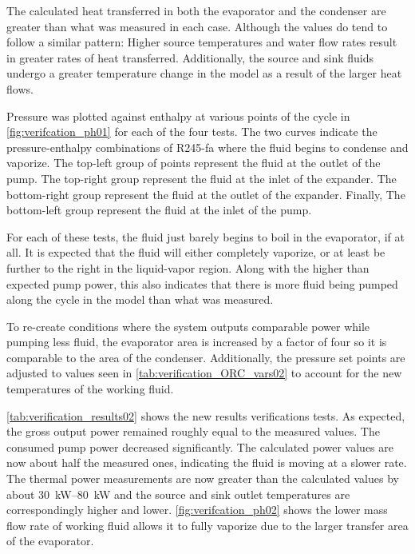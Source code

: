 The calculated heat transferred in both the evaporator and the condenser are greater than what was measured in each case. Although the values do tend to follow a similar pattern: Higher source temperatures and water flow rates result in greater rates of heat transferred. Additionally, the source and sink fluids undergo a greater temperature change in the model as a result of the larger heat flows.




Pressure was plotted against enthalpy at various points of the cycle in \autoref{fig:verifcation_ph01} for each of the four tests. The two curves indicate the pressure-enthalpy combinations of R245-fa where the fluid begins to condense and vaporize. The top-left group of points represent the fluid at the outlet of the pump. The top-right group represent the fluid at the inlet of the expander. The bottom-right group represent the fluid at the outlet of the expander. Finally, The bottom-left group represent the fluid at the inlet of the pump.

For each of these tests, the fluid just barely begins to boil in the evaporator, if at all. It is expected that the fluid will either completely vaporize, or at least be further to the right in the liquid-vapor region. Along with the higher than expected pump power, this also indicates that there is more fluid being pumped along the cycle in the model than what was measured.

To re-create conditions where the system outputs comparable power while pumping less fluid, the evaporator area is increased by a factor of four so it is comparable to the area of the condenser. Additionally, the pressure set points are adjusted to values seen in \autoref{tab:verification_ORC_vars02} to account for the new temperatures of the working fluid.


\autoref{tab:verification_results02} shows the new results verifications tests. As expected, the gross output power remained roughly equal to the measured values. The consumed pump power decreased significantly. The calculated power values are now about half the measured ones, indicating the fluid is moving at a slower rate. The thermal power measurements are now greater than the calculated values by about \SIrange{30}{80}{\kilo\watt} and the source and sink outlet temperatures are correspondingly higher and lower. \autoref{fig:verifcation_ph02} shows the lower mass flow rate of working fluid allows it to fully vaporize due to the larger transfer area of the evaporator. 

